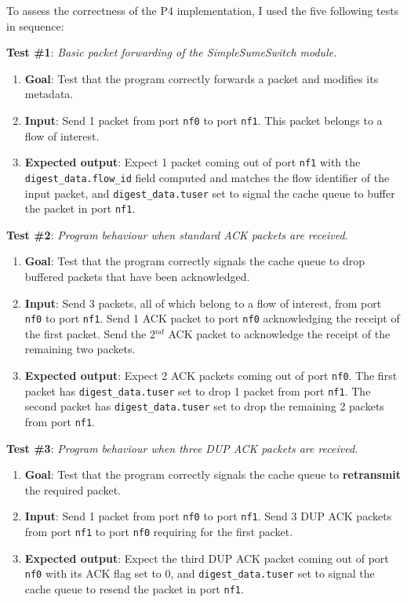 To assess the correctness of the P4 implementation, I used the five following tests in sequence:

\textbf{Test \#1}: \textit{Basic packet forwarding of the SimpleSumeSwitch module.}
\begin{enumerate}[label*=\arabic*.,leftmargin=*, noitemsep]
	\item \textbf{Goal}: Test that the program correctly forwards a packet and modifies its metadata.
	\item \textbf{Input}: Send 1 packet from port \verb|nf0| to port \verb|nf1|. This packet belongs to a flow of interest. 
	\item \textbf{Expected output}: Expect 1 packet coming out of port \verb|nf1| with the \verb|digest_data.flow_id| field computed and matches the flow identifier of the input packet, and \verb|digest_data.tuser| set to signal the cache queue to buffer the packet in port \verb|nf1|.
\end{enumerate}

\textbf{Test \#2}: \textit{Program behaviour when standard ACK packets are received.}
\begin{enumerate}[label*=\arabic*.,leftmargin=*, noitemsep]
	\item \textbf{Goal}: Test that the program correctly signals the cache queue to drop buffered packets that have been acknowledged.
	\item \textbf{Input}: Send 3 packets, all of which belong to a flow of interest, from port \verb|nf0| to port \verb|nf1|. Send 1 ACK packet to port \verb|nf0| acknowledging the receipt of the first packet. Send the 2$^{nd}$ ACK packet to acknowledge the receipt of the remaining two packets.
	\item \textbf{Expected output}: Expect 2 ACK packets coming out of port \verb|nf0|. The first packet has \verb|digest_data.tuser| set to drop 1 packet from port \verb|nf1|. The second packet has \verb|digest_data.tuser| set to drop the remaining 2 packets from port \verb|nf1|.
\end{enumerate}

\textbf{Test \#3}: \textit{Program behaviour when three DUP ACK packets are received.}
\begin{enumerate}[label*=\arabic*.,leftmargin=*, noitemsep]
	\item \textbf{Goal}: Test that the program correctly signals the cache queue to \textbf{retransmit} the required packet.
	\item \textbf{Input}: Send 1 packet from port \verb|nf0| to port \verb|nf1|. Send 3 DUP ACK packets from port \verb|nf1| to port \verb|nf0| requiring for the first packet.
	\item \textbf{Expected output}: Expect the third DUP ACK packet coming out of port \verb|nf0| with its ACK flag set to 0, and \verb|digest_data.tuser| set to signal the cache queue to resend the packet in port \verb|nf1|.
\end{enumerate}

